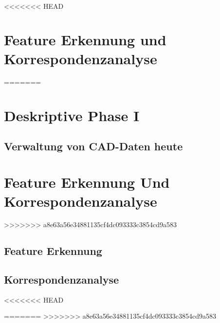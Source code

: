 
<<<<<<< HEAD
\section{Feature Erkennung und Korrespondenzanalyse}
=======
\section{Deskriptive Phase I}
\label{kap:DeskriptivePhaseI}

\subsection{Verwaltung von CAD-Daten heute}
\label{kap:CADheute}


\clearpage
\section{Feature Erkennung Und Korrespondenzanalyse}
>>>>>>> a8e63a56e34881135cf4dc093333c3854cd9a583
\label{kap:FeatureErkennungUndKorrespondenzanalyse}

\subsection{Feature Erkennung}
\label{kap:FeatureErkennung}

\subsection{Korrespondenzanalyse}
\label{kap:Korrespondenzanalyse}
<<<<<<< HEAD


\clearpage
=======
\clearpage
>>>>>>> a8e63a56e34881135cf4dc093333c3854cd9a583
